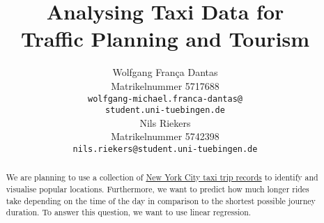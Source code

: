 \documentclass{article}
\title{Analysing Taxi Data for\\ Traffic Planning and Tourism}
\author{%
  Wolfgang França Dantas\\
  Matrikelnummer 5717688\\
  \texttt{wolfgang-michael.franca-dantas@} \\
  \texttt{student.uni-tuebingen.de} \\
  \And
  Nils Riekers\\
  Matrikelnummer 5742398\\
  \texttt{nils.riekers@student.uni-tuebingen.de} \\
}
\begin{document}
\maketitle

\begin{abstract}
    We are planning to use a collection of \href{https://www1.nyc.gov/site/tlc/about/tlc-trip-record-data.page}{New York City taxi trip records} to identify and visualise popular locations. Furthermore, we want to predict how much longer rides take depending on the time of the day in comparison to the shortest possible journey duration. To answer this question, we want to use linear regression.
\end{abstract}
\end{document}
